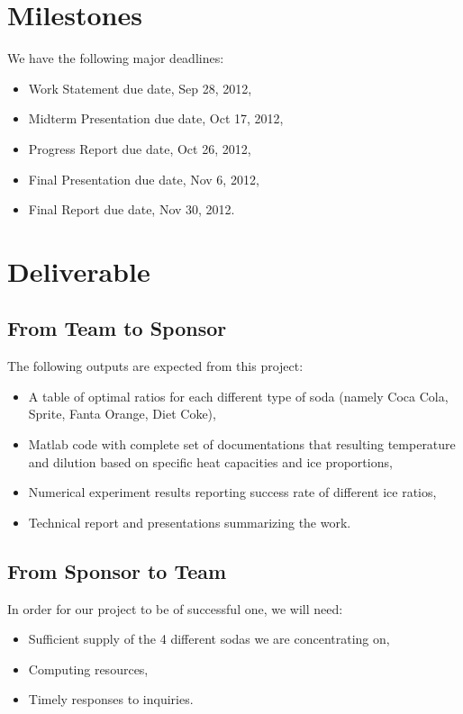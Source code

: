 \documentclass[12pt,letterpaper]{article}
\theoremstyle{definition}
\begin{document}
\section{Milestones}
We have the following major deadlines:
\begin{itemize}
    \item Work Statement due date, Sep 28, 2012,
    \item Midterm Presentation due date, Oct 17, 2012,
    \item Progress Report due date, Oct 26, 2012,
    \item Final Presentation due date, Nov 6, 2012,
    \item Final Report due date, Nov 30, 2012.
\end{itemize}

\section{Deliverable}
\subsection{From Team to Sponsor} %
The following outputs are expected from this project:
\begin{itemize}
    \item A table of optimal ratios for each different type of soda (namely Coca Cola, Sprite, Fanta Orange, Diet Coke),
    \item Matlab code with complete set of documentations that resulting temperature and dilution based on specific heat capacities and ice proportions,
    \item Numerical experiment results reporting success rate of different ice ratios,
    \item Technical report and presentations summarizing the work. 
\end{itemize}

\subsection{From Sponsor to Team} %

In order for our project to be of successful one, we will need:
\begin{itemize}
    \item Sufficient supply of the 4 different sodas we are concentrating on,
    \item Computing resources,
    \item Timely responses to inquiries.
\end{itemize}

%
%
\end{document}
